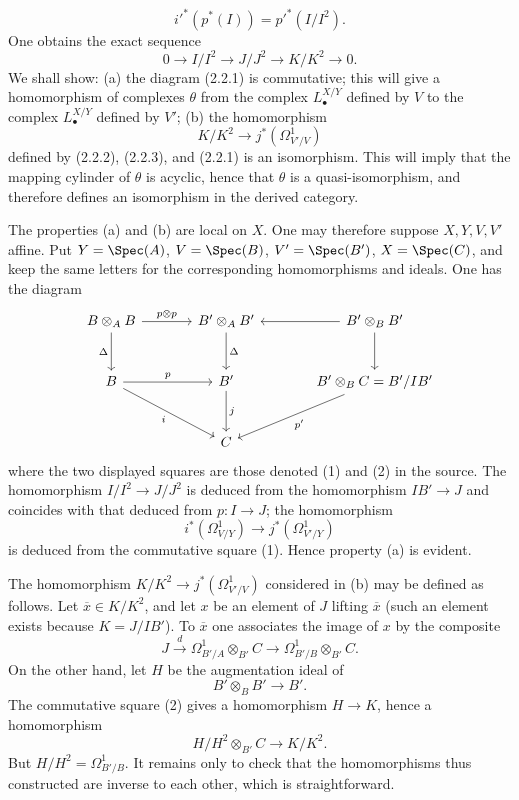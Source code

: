 \[
i'^*(p^*(I))=p'^*(I/I^2).
\]
One obtains the exact sequence
\begin{equation}\tag{2.2.3}
0\longrightarrow I/I^2\longrightarrow J/J^2\longrightarrow K/K^2\longrightarrow0.
\end{equation}
We shall show: (a) the diagram (2.2.1) is commutative; this will give a homomorphism of complexes $\theta$ from the complex $L^{X/Y}_\bullet$ defined by $V$ to the complex $L^{X/Y}_\bullet$ defined by $V'$; (b) the homomorphism
\[
K/K^2\longrightarrow j^*(\Omega^1_{V'/V})
\]
defined by (2.2.2), (2.2.3), and (2.2.1) is an isomorphism. This will imply that the mapping cylinder of $\theta$ is acyclic, hence that $\theta$ is a quasi-isomorphism, and therefore defines an isomorphism in the derived category.

The properties (a) and (b) are local on $X$. One may therefore suppose $X,Y,V,V'$ affine. Put $Y=\Spec(A)$, $V=\Spec(B)$, $V'=\Spec(B')$, $X=\Spec(C)$, and keep the same letters for the corresponding homomorphisms and ideals. One has the diagram
\[
\begin{tikzcd}[column sep=large,row sep=large]
B\otimes_A B \arrow[r,"p\otimes p"] \arrow[d,"\Delta"'] & B'\otimes_A B' \arrow[d,"\Delta"] & B'\otimes_B B' \arrow[l] \arrow[d]\\
B \arrow[r,"p"] \arrow[dr,"i"'] & B' \arrow[d,"j"] & B'\otimes_B C = B'/IB' \arrow[dl,"p'" ]\\
{} & C & {}
\end{tikzcd}
\]
where the two displayed squares are those denoted (1) and (2) in the source.
The homomorphism $I/I^2\to J/J^2$ is deduced from the homomorphism $IB'\to J$ and coincides with that deduced from $p:I\to J$; the homomorphism
\[
i^*(\Omega^1_{V/Y})\longrightarrow j^*(\Omega^1_{V'/Y})
\]
is deduced from the commutative square (1). Hence property (a) is evident.

The homomorphism $K/K^2\to j^*(\Omega^1_{V'/V})$ considered in (b) may be defined as follows. Let $\overline x\in K/K^2$, and let $x$ be an element of $J$ lifting $\overline x$ (such an element exists because $K=J/IB'$). To $\overline x$ one associates the image of $x$ by the composite
\[
J\xrightarrow{d}\Omega^1_{B'/A}\otimes_{B'}C
\longrightarrow\Omega^1_{B'/B}\otimes_{B'}C.
\]
On the other hand, let $H$ be the augmentation ideal of
\[
B'\otimes_B B'\longrightarrow B'.
\]
The commutative square (2) gives a homomorphism $H\to K$, hence a homomorphism
\[
H/H^2\otimes_{B'}C\longrightarrow K/K^2.
\]
But $H/H^2=\Omega^1_{B'/B}$. It remains only to check that the homomorphisms thus constructed are inverse to each other, which is straightforward.

